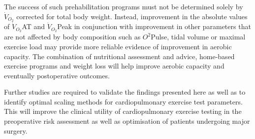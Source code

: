 The success of such prehabilitation programs must not be determined solely by $\dot{V}_{O_2}$ corrected for total body weight. Instead, improvement in the absolute values of $\dot{V}_{O_2}$AT and $\dot{V}_{O_2}$Peak in conjunction with improvement in other parameters that are not affected by body composition such as $O^2$Pulse, tidal volume\parencite{jones_effects_2007} or maximal exercise load may provide more reliable evidence of improvement in aerobic capacity. The combination of nutritional assessment and advice, home-based exercise programs and weight loss will help improve aerobic capacity and eventually postoperative outcomes. 

Further studies are required to validate the findings presented here as well as to identify optimal scaling methods for cardiopulmonary exercise test parameters. This will improve the clinical utility of cardiopulmonary exercise testing in the preoperative risk assessment as well as optimisation of patients undergoing major surgery.















